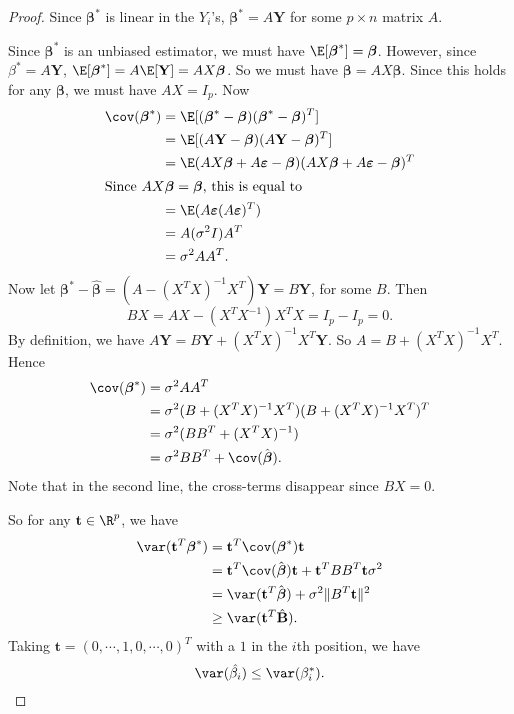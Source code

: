 \documentclass[a4paper]{article}
\begin{document}
\begin{proof}
  Since $\boldsymbol\beta^*$ is linear in the $Y_i$'s, $\boldsymbol\beta^* = A\mathbf{Y}$ for some $p\times n$ matrix $A$.

  Since $\boldsymbol\beta^*$ is an unbiased estimator, we must have $\E[\boldsymbol\beta^*] = \boldsymbol\beta$. However, since $\beta^* = A\mathbf{Y}$, $\E[\boldsymbol\beta^*] = A\E[\mathbf{Y}] = AX\boldsymbol\beta$. So we must have $\boldsymbol\beta = AX\boldsymbol\beta$. Since this holds for any $\boldsymbol\beta$, we must have $AX = I_p$. Now
  \begin{align*}
    \cov(\boldsymbol\beta^*) &= \E[(\boldsymbol\beta^* - \boldsymbol\beta)(\boldsymbol\beta^* - \boldsymbol\beta)^T]\\
    &= \E[(A\mathbf{Y} - \boldsymbol\beta)(A\mathbf{Y} - \boldsymbol\beta)^T]\\
    &= \E(AX\boldsymbol\beta + A\boldsymbol\varepsilon - \boldsymbol\beta)(AX\boldsymbol\beta + A\boldsymbol\varepsilon - \boldsymbol\beta)^T\\
    \intertext{Since $AX\boldsymbol\beta = \boldsymbol\beta$, this is equal to}
    &= \E(A\boldsymbol\varepsilon(A\boldsymbol\varepsilon)^T)\\
    &= A(\sigma^2I)A^T\\
    &= \sigma^2 AA^T.
  \end{align*}
  Now let $\boldsymbol\beta^* - \hat{\boldsymbol\beta} = (A - (X^TX)^{-1}X^T)\mathbf{Y} = B\mathbf{Y}$, for some $B$. Then
  \[
    BX = AX - (X^TX^{-1})X^TX = I_p - I_p = 0.
  \]
  By definition, we have $A\mathbf{Y} = B\mathbf{Y} + (X^TX)^{-1}X^T \mathbf{Y}$. So $A = B + (X^TX)^{-1}X^T$. Hence
  \begin{align*}
    \cov(\boldsymbol\beta^*) &= \sigma^2AA^T\\
    &= \sigma^2(B + (X^TX)^{-1}X^T)(B + (X^TX)^{-1}X^T)^T\\
    &= \sigma^2(BB^T + (X^TX)^{-1})\\
    &= \sigma^2 BB^T + \cov(\hat{\boldsymbol\beta}).
  \end{align*}
  Note that in the second line, the cross-terms disappear since $BX = 0$.

  So for any $\mathbf{t}\in \R^p$, we have
  \begin{align*}
    \var(\mathbf{t}^T\boldsymbol\beta^*) &= \mathbf{t}^T\cov(\boldsymbol\beta^*)\mathbf{t} \\
    &= \mathbf{t}^T\cov (\hat{\boldsymbol\beta})\mathbf{t} + \mathbf{t}^TBB^T\mathbf{t}\sigma^2\\
    &= \var(\mathbf{t}^T \hat{\boldsymbol\beta}) + \sigma^2\|B^T\mathbf{t}\|^2\\
    &\geq \var (\mathbf{t}^T\hat{\mathbf{B}}).
  \end{align*}
  Taking $\mathbf{t} = (0, \cdots, 1, 0, \cdots, 0)^T$ with a $1$ in the $i$th position, we have
  \[
    \var(\hat{\beta_i}) \leq \var(\beta_i^*).
  \]
\end{proof}
\end{document}
